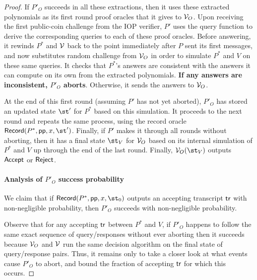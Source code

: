 \begin{proof}
If $P'_O$ succeeds in all these extractions, then it uses these extracted polynomials as its first round proof oracles that it gives to $\mathcal{V}_O$. Upon receiving the first public-coin challenge from the IOP verifier, $P'$ uses the query function to derive the corresponding queries to each of these proof oracles. Before answering, it rewinds $P^*$ and $\mathcal{V}$ back to the point immediately after $P$ sent its first messages, and now substitutes random challenge from $\mathcal{V}_O$ in order to simulate $P^*$ and $V$ on these same queries. It checks that $P^*$'s answers are consistent with the answers it can compute on its own from the extracted polynomials. \textbf{If any answers are inconsistent, $P'_O$ aborts}. Otherwise, it sends the answers to $\mathcal{V}_O$. 

At the end of this first round (assuming $P'$ has not yet aborted), $P'_O$ has stored an updated state $\st'$ for $P^*$ based on this simulation. It proceeds to the next round and repeats the same process, using the record oracle $\pro{Record}(P^*, \params, x, \st')$. Finally, if $P'$ makes it through all rounds without aborting, then it has a final state $\st_V$ for $\mathcal{V}_O$ based on its internal simulation of $P^*$ and $V$ up through the end of the last round. Finally, $\verifier_O(\st_V)$ outputs $\textsf{{Accept}}$ or $\textsf{{Reject}}$. %

\paragraph{Analysis of $P'_O$ success probability} 
We claim that if $\pro{Record}(P^*, \params, x, \st_0)$ outputs an accepting transcript $\textsf{{tr}}$ with non-negligible probability, then $P'_O$ succeeds with non-negligible probability. 

Observe that for any accepting $\textsf{{tr}}$ between $P^*$ and $V$, if $P'_O$ happens to follow the same exact sequence of query/responses without ever aborting then it succeeds because $\mathcal{V}_O$ and $\mathcal{V}$ run the same decision algorithm on the final state of query/response pairs. Thus, it remains only to take a closer look at what events cause $P'_O$ to abort, and bound the fraction of accepting $\textsf{{tr}}$ for which this occurs. 


\end{proof}
